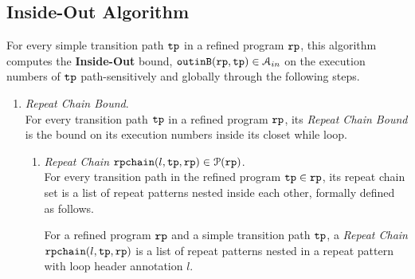 \subsection{Inside-Out Algorithm}
\label{sec:pathsensitive_rb-inoutalg}
For every simple transition path $\mathtt{tp}$ in a refined program $\mathtt{rp}$, 
this algorithm
computes the \textbf{Inside-Out} bound, $\mathtt{outinB}(\mathtt{rp}, \mathtt{tp}) \in \mathcal{A}_{in}$
on the execution numbers of $\mathtt{tp}$ path-sensitively and globally
through the following steps.

\begin{enumerate}
  \item \emph{Repeat Chain Bound}.
  \\
  For every transition path $\mathtt{tp}$ in a refined program $\mathtt{rp}$,
  its \emph{Repeat Chain Bound} is the
  bound on its execution numbers inside its closet while loop.
  \begin{enumerate}
\item \emph{Repeat Chain} $\mathtt{rpchain}(l, \mathtt{tp}, \mathtt{rp}) \in \mathcal{P}(\mathtt{rp})$.
\\
For every transition path in the refined program $\mathtt{tp} \in \mathtt{rp}$, 
its repeat chain set %
is a list of repeat patterns nested inside each other, formally defined as follows.
 \begin{defn}
  \label{def:repeatchain}
For a refined program $\mathtt{rp}$ and a simple transition path $\mathtt{tp}$,
a \emph{Repeat Chain} $\mathtt{rpchain}(l, \mathtt{tp}, \mathtt{rp})$
is a list of repeat patterns nested in a repeat pattern with loop header annotation $l$.

\end{defn}
\end{enumerate}
\end{enumerate}
